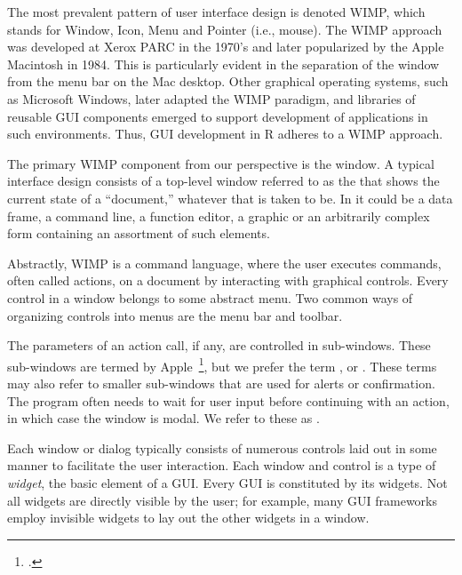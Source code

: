 

The most prevalent pattern of user interface design is denoted WIMP,
which stands for Window, Icon, Menu and Pointer (i.e., mouse). The
WIMP approach was developed at Xerox PARC in the 1970's and later
popularized by the Apple Macintosh in 1984. This is particularly
evident in the separation of the window from the menu bar on the Mac
desktop. Other graphical operating systems, such as Microsoft Windows,
later adapted the WIMP paradigm, and libraries of reusable GUI
components emerged to support development of applications in such
environments. Thus, GUI development in R adheres to a WIMP approach.

The primary WIMP component from our perspective is the window. A
typical interface design consists of a top-level window referred to as
the  that shows the current state of a
``document,'' whatever that is taken to be. In \R\/ it could be a data
frame, a command line, a function editor, a graphic or an arbitrarily
complex form containing an assortment of such elements. 


Abstractly, WIMP is a command language, where the user executes
commands, often called actions, on a document by interacting with
graphical controls. Every control in a window belongs to some abstract
menu. Two common ways of organizing controls into menus are the
menu bar and toolbar.

The parameters of an action call, if any, are controlled in
sub-windows. These sub-windows are termed 
by Apple~\footcite{APPLE:HIG}, but we prefer the term ,
or . These terms may also refer to smaller
sub-windows that are used for alerts or confirmation. The program
often needs to wait for user input before continuing with an action,
in which case the window is modal. We refer to these as .

Each window or dialog typically consists of numerous controls laid out
in some manner to facilitate the user interaction. Each window and
control is a type of \textit{widget}, the basic element of a
GUI. Every GUI is constituted by its widgets. Not all widgets are
directly visible by the user; for example, many GUI frameworks employ
invisible widgets to lay out the other widgets in a window.


